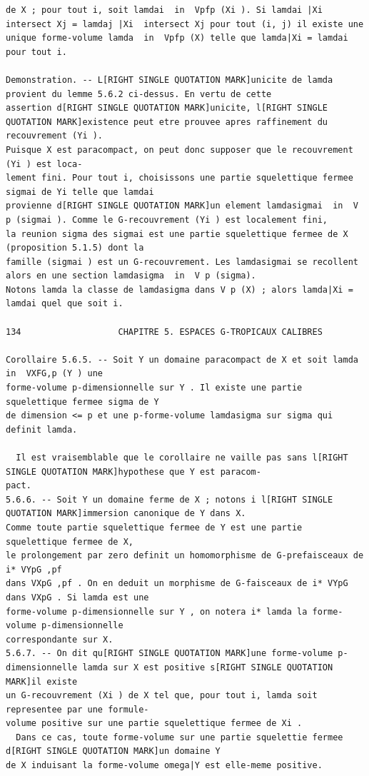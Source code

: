 \documentclass[
  11pt,
]{article}
\begin{document}
\begin{lstlisting}
de X ; pour tout i, soit lamdai  in  Vpfp (Xi ). Si lamdai |Xi  intersect Xj = lamdaj |Xi  intersect Xj pour tout (i, j) il existe une
unique forme-volume lamda  in  Vpfp (X) telle que lamda|Xi = lamdai pour tout i.

Demonstration. -- L[RIGHT SINGLE QUOTATION MARK]unicite de lamda provient du lemme 5.6.2 ci-dessus. En vertu de cette
assertion d[RIGHT SINGLE QUOTATION MARK]unicite, l[RIGHT SINGLE QUOTATION MARK]existence peut etre prouvee apres raffinement du recouvrement (Yi ).
Puisque X est paracompact, on peut donc supposer que le recouvrement (Yi ) est loca-
lement fini. Pour tout i, choisissons une partie squelettique fermee sigmai de Yi telle que lamdai
provienne d[RIGHT SINGLE QUOTATION MARK]un element lamdasigmai  in  V p (sigmai ). Comme le G-recouvrement (Yi ) est localement fini,
la reunion sigma des sigmai est une partie squelettique fermee de X (proposition 5.1.5) dont la
famille (sigmai ) est un G-recouvrement. Les lamdasigmai se recollent alors en une section lamdasigma  in  V p (sigma).
Notons lamda la classe de lamdasigma dans V p (X) ; alors lamda|Xi = lamdai quel que soit i.

134                   CHAPITRE 5. ESPACES G-TROPICAUX CALIBRES

Corollaire 5.6.5. -- Soit Y un domaine paracompact de X et soit lamda  in  VXFG,p (Y ) une
forme-volume p-dimensionnelle sur Y . Il existe une partie squelettique fermee sigma de Y
de dimension <= p et une p-forme-volume lamdasigma sur sigma qui definit lamda.

  Il est vraisemblable que le corollaire ne vaille pas sans l[RIGHT SINGLE QUOTATION MARK]hypothese que Y est paracom-
pact.
5.6.6. -- Soit Y un domaine ferme de X ; notons i l[RIGHT SINGLE QUOTATION MARK]immersion canonique de Y dans X.
Comme toute partie squelettique fermee de Y est une partie squelettique fermee de X,
le prolongement par zero definit un homomorphisme de G-prefaisceaux de i* VYpG ,pf
dans VXpG ,pf . On en deduit un morphisme de G-faisceaux de i* VYpG dans VXpG . Si lamda est une
forme-volume p-dimensionnelle sur Y , on notera i* lamda la forme-volume p-dimensionnelle
correspondante sur X.
5.6.7. -- On dit qu[RIGHT SINGLE QUOTATION MARK]une forme-volume p-dimensionnelle lamda sur X est positive s[RIGHT SINGLE QUOTATION MARK]il existe
un G-recouvrement (Xi ) de X tel que, pour tout i, lamda soit representee par une formule-
volume positive sur une partie squelettique fermee de Xi .
  Dans ce cas, toute forme-volume sur une partie squelettie fermee d[RIGHT SINGLE QUOTATION MARK]un domaine Y
de X induisant la forme-volume omega|Y est elle-meme positive.





\end{lstlisting}
\end{document}
